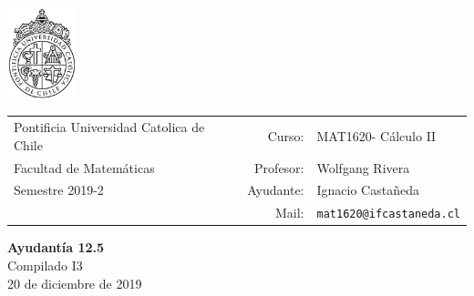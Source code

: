 \documentclass[12pt]{article}
\makeatletter
\newcommand{\ayudantia}{{\sc Ayudantía 12.5}}
\newcommand{\tituloayu}{Compilado I3}
\newcommand{\fecha}{20 de diciembre de 2019}
\newcommand{\sigla}{MAT1620}
\newcommand{\nombre}{Cálculo II}
\newcommand{\profesor}{Wolfgang Rivera}
\newcommand{\ano}{2019}
\newcommand{\semestre}{2}
\newcommand{\mail}{mat1620@ifcastaneda.cl}
\makeatother
\begin{document}
\thispagestyle{empty}

\begin{minipage}{2cm}
	\includegraphics[width=2cm]{../../../../img/logo.pdf}
	\vspace{0.5cm}
\end{minipage}
\begin{minipage}{\linewidth}
	\begin{tabular}{lrl}
		{\scriptsize\sc Pontificia Universidad Catolica de Chile} & \hspace*{0.7in}Curso: &
		\sigla  - \nombre\\
		{\sc Facultad de Matemáticas}&
		Profesor: & \profesor \\
		{\sc Semestre \ano-\semestre} & Ayudante: & {Ignacio Castañeda}\\
		& {Mail:} & \texttt{\mail}
	\end{tabular}
\end{minipage}

\vspace{-10mm}
\begin{center}
	{\LARGE\bf \ayudantia}\\
	\vspace{0.1cm}
	{\tituloayu}\\
	\vspace{0.1cm}
	\fecha\\
	\vspace{0.4cm}
\end{center}
\end{document}
